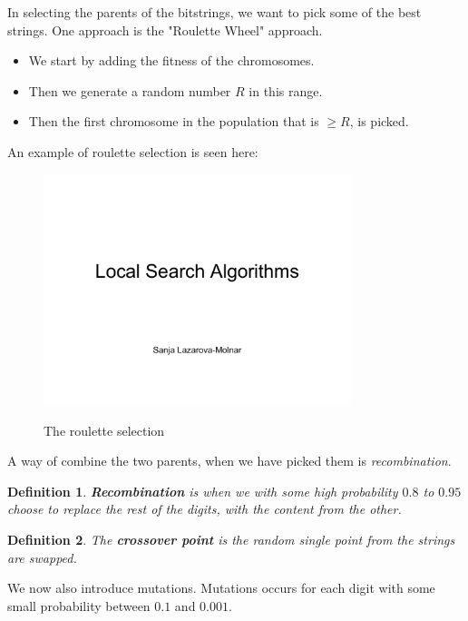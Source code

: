\documentclass{article}
\newtheorem{definition}{Definition}[section]
\begin{document}
In selecting the parents of the bitstrings, we want to pick some of the best
strings. One approach is the "Roulette Wheel" approach.
\begin{itemize}
  \item We start by adding the fitness of the chromosomes.
  \item Then we generate a random number $R$ in this range.
  \item Then the first chromosome in the population that is $\geq R$, is picked.
\end{itemize}

An example of roulette selection is seen here:


\begin{figure}[H]
  \centering
  \includegraphics[page=41,
  width=0.8\textwidth]{../presentations/w10_lec05_local_search_sanja_2021.pdf}
  \label{fig:roulette_wheel}
  \caption{The roulette selection}
\end{figure}

A way of combine the two parents, when we have picked them is
\emph{recombination}.

\begin{definition}
  \textbf{Recombination} is when we with some high probability $0.8$ to $0.95$
  choose to replace the rest of the digits, with the content from the other. 
\end{definition}

\begin{definition}
  The \textbf{crossover point} is the random single point from the strings are
  swapped.
\end{definition}

We now also introduce mutations. Mutations occurs for each digit with some small
probability between $0.1$ and $0.001$.
\end{document}
